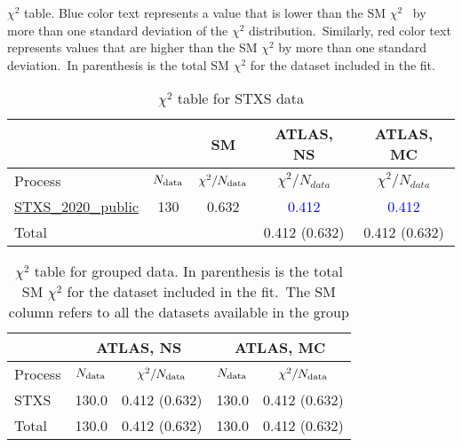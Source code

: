\documentclass{article}
\begin{document}
$\chi^2$ table. Blue color text represents a value that is lower than the SM $\chi^2$ \
            by more than one standard deviation of the $\chi^2$ distribution.\
            Similarly, red color text represents values that are higher than the SM $\chi^2$ by more than one standard deviation.\
            In parenthesis is the total SM $\chi^2$ for the dataset included in the fit. \\
\begin{table}[H]
\centering
\begin{tabular}{|l|c|c|c|c|}
\hline
 \multicolumn{2}{|c|}{} & SM& ATLAS, NS& ATLAS, MC\\ \hline
Process & $N_{\rm data}$ & $\chi^ 2/N_{\rm data}$& $\chi^ 2/N_{data}$& $\chi^ 2/N_{data}$\\ \hline
\href{https://arxiv.org/abs/1302.3415}{STXS_2020_public} & 130 & 0.632 & \textcolor{blue}                            {0.412} & \textcolor{blue}                            {0.412} \\ \hline
\hline Total & &  & 0.412 (0.632) & 0.412 (0.632) \\ \hline
\end{tabular}
\caption{$\chi^2$ table for STXS data}
\end{table}




\begin{table}[H]
\centering
\begin{tabular}{|l|c|c|c|c|}
\hline
& \multicolumn{2}{c|}{ATLAS, NS}& \multicolumn{2}{c|}{ATLAS, MC}\\ \hline
Process  & $N_{\rm data}$ & $\chi^2/N_{\rm data}$ & $N_{\rm data}$ & $\chi^2/N_{\rm data}$\\ \hline
STXS & 130.0                         & 0.412                             (0.632) & 130.0                         & 0.412                             (0.632) \\ \hline
 \hline Total & 130.0                 & 0.412                     (0.632) & 130.0                 & 0.412                     (0.632) \\ \hline
\end{tabular}
\caption{$\chi^2$ table for grouped data. In parenthesis is the total SM $\chi^2$ for the dataset included in the fit.\
                    The SM column refers to all the datasets available in the group}
\end{table}
\end{document}
